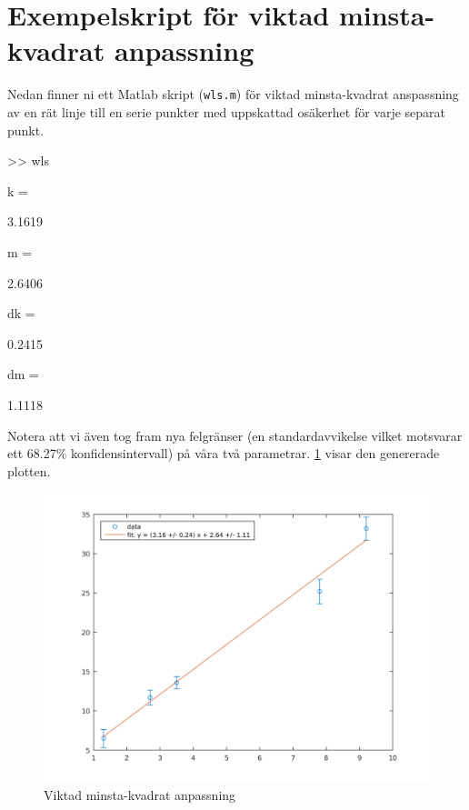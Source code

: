 \section{Exempelskript för viktad minsta-kvadrat anpassning}
\label{sec:matlab-wls}
Nedan finner ni ett Matlab skript ({\tt wls.m}) för viktad
minsta-kvadrat anspassning av en rät linje till en serie punkter med
uppskattad osäkerhet för varje separat punkt.


\begin{terminaloutput}
>> wls

k =

    3.1619


m =

    2.6406


dk =

    0.2415


dm =

    1.1118
\end{terminaloutput}

Notera att vi även tog fram nya felgränser (en standardavvikelse vilket
motsvarar ett 68.27\% konfidensintervall) på våra två
parametrar. \cref{fig:matlab-wls} visar den genererade plotten.

\begin{figure}
  \centering
  \includegraphics[scale=0.5]{matlab/wls_fit.png}
  \caption{Viktad minsta-kvadrat anpassning}
  \label{fig:matlab-wls}
\end{figure}

